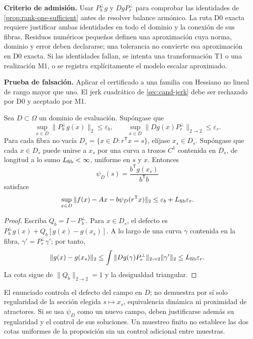 \begin{proposalbox}
\textbf{Criterio de admisión.} Usar
\(P_b^\perp g\) y \(DgP_r^\perp\) para comprobar las identidades de
\cref{prop:rank-one-sufficient} antes de resolver balance armónico. La ruta D0
exacta requiere justificar ambas identidades en todo el dominio y la conexión
de sus fibras. Residuos numéricos pequeños definen una aproximación cuya norma,
dominio y error deben declararse; una tolerancia no convierte esa aproximación
en D0 exacta. Si las identidades fallan, se intenta una transformación T1 o una
realización M1, o se registra explícitamente el modelo escalar aproximado.

\textbf{Prueba de falsación.} Aplicar el certificado a una familia con
Hessiano no lineal de rango mayor que uno. El jerk cuadrático de
\cref{sec:cand-jerk} debe ser rechazado por D0 y aceptado por M1.
\end{proposalbox}

\begin{proposition}
\label{prop:rank-one-approximation-bound}
Sea \(D\subset\Omega\) un dominio de evaluación. Supóngase que
\[
 \sup_{x\in D}\|P_b^\perp g(x)\|_2\le\varepsilon_b,
 \qquad
 \sup_{x\in D}\|Dg(x)P_r^\perp\|_{2\to2}\le\varepsilon_r.
\]
Para cada fibra no vacía \(D_s=\{x\in D:r^{\mathsf T}x=s\}\), elíjase
\(x_s\in D_s\). Supóngase que cada \(x\in D_s\) puede unirse a \(x_s\)
por una curva a trozos \(C^1\) contenida en \(D_s\), de longitud a lo sumo
\(L_{\rm fib}<\infty\), uniforme en \(s\) y \(x\). Entonces
\[
 \psi_D(s)=\frac{b^{\mathsf T}g(x_s)}{b^{\mathsf T}b}
\]
satisface
\[
 \sup_{x\in D}\|f(x)-Ax-b\psi_D(r^{\mathsf T}x)\|_2
 \le\varepsilon_b+L_{\rm fib}\varepsilon_r.
\]
\end{proposition}

\begin{proof}
Escriba \(Q_b=I-P_b^\perp\). Para \(x\in D_s\), el defecto es
\(P_b^\perp g(x)+Q_b[g(x)-g(x_s)]\). A lo largo de una curva \(\gamma\)
contenida en la fibra, \(\gamma'=P_r^\perp\gamma'\); por tanto,
\[
 \|g(x)-g(x_s)\|_2
 \le\int\|Dg(\gamma)P_r^\perp\|_{2\to2}\|\gamma'\|_2
 \le L_{\rm fib}\varepsilon_r.
\]
La cota sigue de \(\|Q_b\|_{2\to2}=1\) y la desigualdad triangular.
\end{proof}

El enunciado controla el defecto del campo en \(D\); no demuestra por sí solo
regularidad de la sección elegida \(s\mapsto x_s\), equivalencia dinámica ni
proximidad de atractores. Si se usa \(\psi_D\) como un nuevo campo, deben
justificarse además su regularidad y el control de sus soluciones. Un muestreo
finito no establece las dos cotas uniformes de la proposición sin un control
adicional entre muestras.


